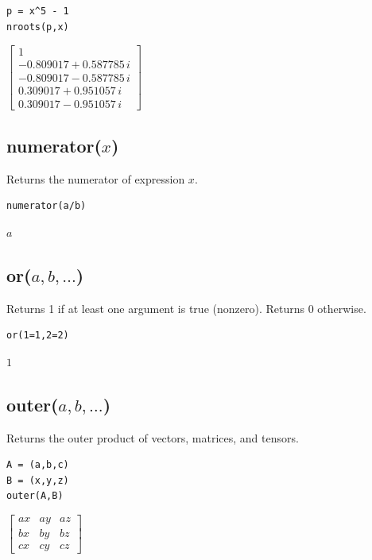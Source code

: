 \documentclass[12pt]{article}
\begin{document}
{\color{blue}
\begin{verbatim}
p = x^5 - 1
nroots(p,x)
\end{verbatim}
}

\noindent
$\displaystyle
\begin{bmatrix}
1
\\[1ex]
-0.809017 + 0.587785\,i
\\[1ex]
-0.809017 - 0.587785\,i
\\[1ex]
0.309017 + 0.951057\,i
\\[1ex]
0.309017 - 0.951057\,i
\end{bmatrix}
$

\subsection*{numerator($x$)}

Returns the numerator of expression $x$.

{\color{blue}
\begin{verbatim}
numerator(a/b)
\end{verbatim}
}

\noindent
$a$

\subsection*{or($a,b,\ldots$)}

Returns 1 if at least one argument is true (nonzero).
Returns 0 otherwise.

{\color{blue}
\begin{verbatim}
or(1=1,2=2)
\end{verbatim}
}

\noindent
$1$

\subsection*{outer($a,b,\ldots$)}

Returns the outer product of vectors, matrices, and tensors.

{\color{blue}
\begin{verbatim}
A = (a,b,c)
B = (x,y,z)
outer(A,B)
\end{verbatim}
}

\noindent
$\displaystyle
\begin{bmatrix}
a x & a y & a z
\\[1ex]
b x & b y & b z
\\[1ex]
c x & c y & c z
\end{bmatrix}
$
\end{document}
